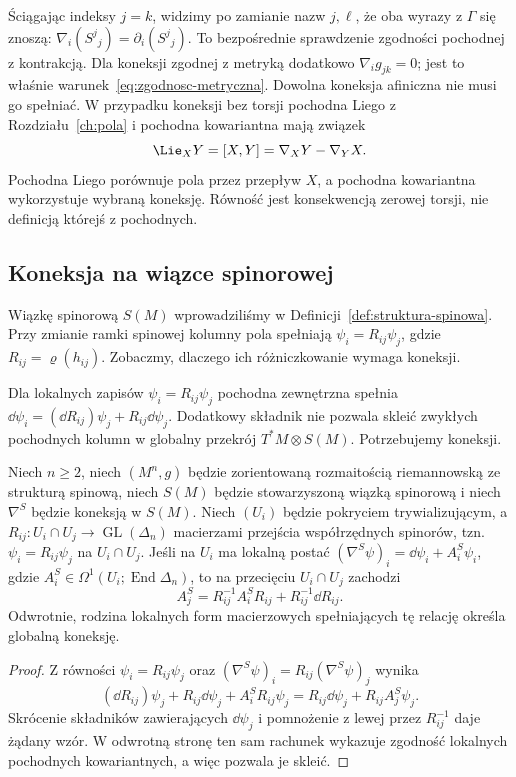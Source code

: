 Ściągając indeksy $j=k$, widzimy po zamianie nazw
$j,\ell$, że oba wyrazy z $\Gamma$ się znoszą:
$\nabla_i(S^j{}_j)=\partial_i(S^j{}_j)$.
To bezpośrednie sprawdzenie zgodności pochodnej z kontrakcją.
Dla koneksji zgodnej z metryką dodatkowo $\nabla_i g_{jk}=0$;
jest to właśnie warunek~\eqref{eq:zgodnosc-metryczna}.
Dowolna koneksja afiniczna nie musi go spełniać.
W przypadku koneksji bez torsji pochodna Liego
z Rozdziału~\ref{ch:pola} i pochodna
kowariantna mają związek
\begin{equation}\label{eq:lie-koneksja}
 \Lie_XY=[X,Y]=\nabla_XY-\nabla_YX.
\end{equation}
Pochodna Liego porównuje pola przez przepływ
$X$, a pochodna kowariantna wykorzystuje
wybraną koneksję. Równość jest konsekwencją
zerowej torsji, nie definicją którejś z pochodnych.

\subsection*{Koneksja na wiązce spinorowej}
\label{sec:koneksja-spinorowa-transformacja}

Wiązkę spinorową $S(M)$ wprowadziliśmy
w Definicji~\ref{def:struktura-spinowa}.
Przy zmianie ramki spinowej kolumny pola spełniają
$\psi_i=R_{ij}\psi_j$, gdzie $R_{ij}=\varrho(h_{ij})$.
Zobaczmy, dlaczego ich różniczkowanie wymaga koneksji.

Dla lokalnych zapisów $\psi_i=R_{ij}\psi_j$ pochodna
zewnętrzna spełnia
$\dd\psi_i=(\dd R_{ij})\psi_j+R_{ij}\dd\psi_j$.
Dodatkowy składnik nie pozwala skleić zwykłych
pochodnych kolumn w globalny przekrój
$T^*M\otimes S(M)$. Potrzebujemy koneksji.

\begin{stwierdzenie}
\label{prop:pola-spinorowe-transformacja-koneksji}
Niech $n\geq2$, niech $(M^n,g)$ będzie zorientowaną
rozmaitością riemannowską ze strukturą spinową,
niech $S(M)$ będzie stowarzyszoną wiązką spinorową
i niech $\nabla^S$ będzie koneksją w $S(M)$.
Niech $(U_i)$ będzie pokryciem trywializującym,
a $R_{ij}:U_i\cap U_j\to\operatorname{GL}(\Delta_n)$
macierzami przejścia współrzędnych spinorów, tzn.
$\psi_i=R_{ij}\psi_j$ na $U_i\cap U_j$.
Jeśli na $U_i$ ma lokalną postać
$(\nabla^S\psi)_i=\dd\psi_i+A_i^S\psi_i$,
gdzie $A_i^S\in\Omega^1(U_i;\operatorname{End}\Delta_n)$,
to na przecięciu $U_i\cap U_j$ zachodzi
\begin{equation}\label{eq:pola-spinorowe-transformacja-koneksji}
 A_j^S=R_{ij}^{-1}A_i^SR_{ij}+R_{ij}^{-1}\dd R_{ij}.
\end{equation}
Odwrotnie, rodzina lokalnych form macierzowych
spełniających tę relację określa globalną koneksję.
\end{stwierdzenie}
\begin{proof}
Z równości $\psi_i=R_{ij}\psi_j$ oraz
$(\nabla^S\psi)_i=R_{ij}(\nabla^S\psi)_j$
wynika
\[
 (\dd R_{ij})\psi_j+R_{ij}\dd\psi_j
   +A_i^SR_{ij}\psi_j
 =R_{ij}\dd\psi_j+R_{ij}A_j^S\psi_j.
\]
Skrócenie składników zawierających $\dd\psi_j$
i pomnożenie z lewej przez $R_{ij}^{-1}$ daje
żądany wzór. W odwrotną stronę ten sam rachunek
wykazuje zgodność lokalnych pochodnych kowariantnych,
a więc pozwala je skleić.
\end{proof}

